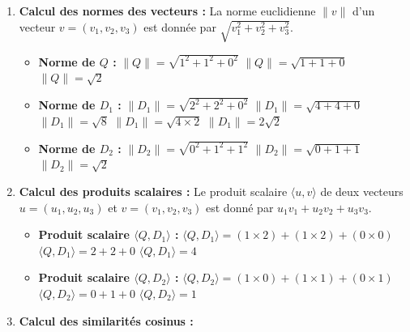 \documentclass[11pt,a4paper]{report}
\begin{document}
\begin{enumerate}
\def\labelenumi{\arabic{enumi}.}
\item
  \textbf{Calcul des normes des vecteurs :} La norme euclidienne
  \(\|v\|\) d'un vecteur \(v=(v_1, v_2, v_3)\) est donnée par
  \(\sqrt{v_1^2 + v_2^2 + v_3^2}\).

  \begin{itemize}
  \item
    \textbf{Norme de \(Q\) :} \(\|Q\| = \sqrt{1^2 + 1^2 + 0^2}\)
    \(\|Q\| = \sqrt{1 + 1 + 0}\) \(\|Q\| = \sqrt{2}\)
  \item
    \textbf{Norme de \(D_1\) :} \(\|D_1\| = \sqrt{2^2 + 2^2 + 0^2}\)
    \(\|D_1\| = \sqrt{4 + 4 + 0}\) \(\|D_1\| = \sqrt{8}\)
    \(\|D_1\| = \sqrt{4 \times 2}\) \(\|D_1\| = 2\sqrt{2}\)
  \item
    \textbf{Norme de \(D_2\) :} \(\|D_2\| = \sqrt{0^2 + 1^2 + 1^2}\)
    \(\|D_2\| = \sqrt{0 + 1 + 1}\) \(\|D_2\| = \sqrt{2}\)
  \end{itemize}
\item
  \textbf{Calcul des produits scalaires :} Le produit scalaire
  \(\langle u, v \rangle\) de deux vecteurs \(u=(u_1, u_2, u_3)\) et
  \(v=(v_1, v_2, v_3)\) est donné par \(u_1v_1 + u_2v_2 + u_3v_3\).

  \begin{itemize}
  \item
    \textbf{Produit scalaire \(\langle Q, D_1 \rangle\) :}
    \(\langle Q, D_1 \rangle = (1 \times 2) + (1 \times 2) + (0 \times 0)\)
    \(\langle Q, D_1 \rangle = 2 + 2 + 0\)
    \(\langle Q, D_1 \rangle = 4\)
  \item
    \textbf{Produit scalaire \(\langle Q, D_2 \rangle\) :}
    \(\langle Q, D_2 \rangle = (1 \times 0) + (1 \times 1) + (0 \times 1)\)
    \(\langle Q, D_2 \rangle = 0 + 1 + 0\)
    \(\langle Q, D_2 \rangle = 1\)
  \end{itemize}
\item
  \textbf{Calcul des similarités cosinus :}


\end{enumerate}
\end{document}
